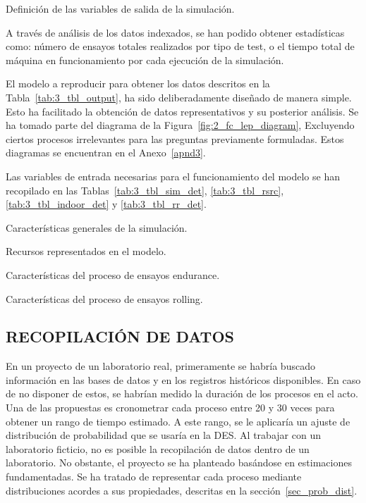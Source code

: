 \begin{table}[H]
	\centering
	\caption{Definición de las variables de salida de la simulación.}
	
	\label{tab:3_tbl_output}
\end{table}

A través de análisis de los datos indexados,
se han podido obtener estadísticas como:
número de ensayos totales realizados por tipo de test,
o el tiempo total de máquina en funcionamiento
por cada ejecución de la simulación.

El modelo a reproducir para obtener los datos descritos
en la Tabla~\ref{tab:3_tbl_output},
ha sido deliberadamente diseñado de manera simple.
Esto ha facilitado la obtención de datos representativos
y su posterior análisis.
Se ha tomado parte del diagrama de la Figura~\ref{fig:2_fc_lep_diagram},
Excluyendo ciertos procesos irrelevantes
para las preguntas previamente formuladas.
Estos diagramas se encuentran en el Anexo~\ref{apnd3}.

Las variables de entrada necesarias para el funcionamiento del modelo
se han recopilado en las Tablas~\ref{tab:3_tbl_sim_det},
\ref{tab:3_tbl_rsrc},
\ref{tab:3_tbl_indoor_det}
y \ref{tab:3_tbl_rr_det}.

\begin{table}[H]
	\centering
	\caption{Características generales de la simulación.}
	
	\label{tab:3_tbl_sim_det}
\end{table}

\begin{table}[H]
	\centering
	\caption{Recursos representados en el modelo.}
	
	\label{tab:3_tbl_rsrc}
\end{table}

\begin{table}
	\centering
	\caption{Características del proceso de ensayos endurance.}
	
	\label{tab:3_tbl_indoor_det}
\end{table}

\begin{table}
	\centering
	\caption{Características del proceso de ensayos rolling.}
	
	\label{tab:3_tbl_rr_det}
\end{table}


\subsection{RECOPILACIÓN DE DATOS}

En un proyecto de un laboratorio real,
primeramente se habría buscado información en las bases de datos y en los registros históricos disponibles.
En caso de no disponer de estos,
se habrían medido la duración de los procesos en el acto.
Una de las propuestas es cronometrar cada proceso entre 20 y 30 veces
para obtener un rango de tiempo estimado.
A este rango, se le aplicaría un
ajuste de distribución de probabilidad que se usaría en la DES.
Al trabajar con un laboratorio ficticio,
no es posible la recopilación de datos dentro de un laboratorio.
No obstante, el proyecto se ha planteado basándose en
estimaciones fundamentadas.
Se ha tratado de representar cada proceso mediante
distribuciones acordes a sus propiedades,
descritas en la sección~\ref{sec_prob_dist}.

